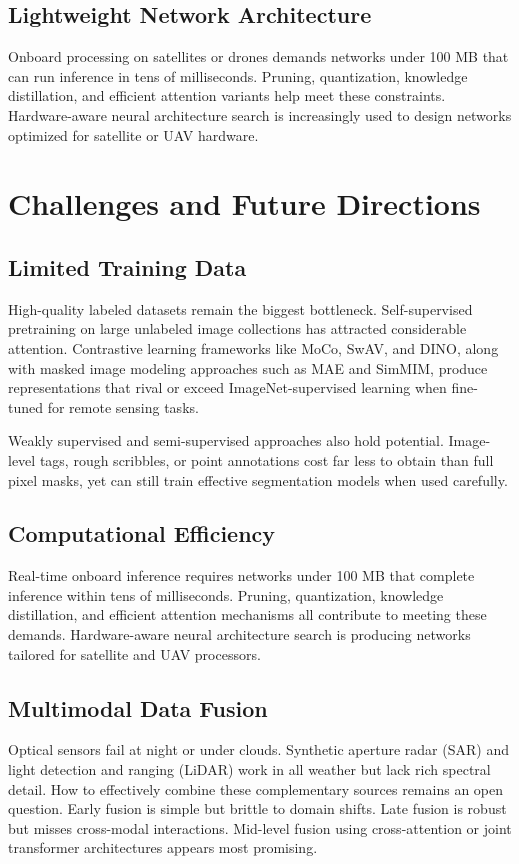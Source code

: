 \documentclass[12pt,a4paper]{article}
\begin{document}
\subsection{Lightweight Network Architecture}
Onboard processing on satellites or drones demands networks under 100 MB that can run inference in tens of milliseconds. Pruning, quantization, knowledge distillation, and efficient attention variants help meet these constraints. Hardware-aware neural architecture search is increasingly used to design networks optimized for satellite or UAV hardware.

\section{Challenges and Future Directions}
\label{sec:challenges}
\subsection{Limited Training Data}
High-quality labeled datasets remain the biggest bottleneck. Self-supervised pretraining on large unlabeled image collections has attracted considerable attention. Contrastive learning frameworks like MoCo, SwAV, and DINO, along with masked image modeling approaches such as MAE and SimMIM, produce representations that rival or exceed ImageNet-supervised learning when fine-tuned for remote sensing tasks.

Weakly supervised and semi-supervised approaches also hold potential. Image-level tags, rough scribbles, or point annotations cost far less to obtain than full pixel masks, yet can still train effective segmentation models when used carefully.

\subsection{Computational Efficiency}
Real-time onboard inference requires networks under 100 MB that complete inference within tens of milliseconds. Pruning, quantization, knowledge distillation, and efficient attention mechanisms all contribute to meeting these demands. Hardware-aware neural architecture search is producing networks tailored for satellite and UAV processors.

\subsection{Multimodal Data Fusion}
Optical sensors fail at night or under clouds. Synthetic aperture radar (SAR) and light detection and ranging (LiDAR) work in all weather but lack rich spectral detail. How to effectively combine these complementary sources remains an open question. Early fusion is simple but brittle to domain shifts. Late fusion is robust but misses cross-modal interactions. Mid-level fusion using cross-attention or joint transformer architectures appears most promising.
\end{document}
